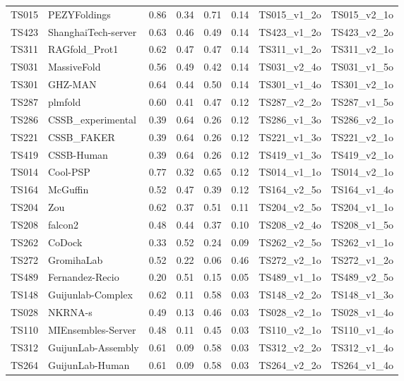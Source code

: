 \begin{longtable}{llllllll}
TS015 & PEZYFoldings & 0.86 & 0.34 & 0.71 & 0.14 & TS015\_v1\_2o & TS015\_v2\_1o \\ 
TS423 & ShanghaiTech-server & 0.63 & 0.46 & 0.49 & 0.14 & TS423\_v1\_2o & TS423\_v2\_2o \\ 
TS311 & RAGfold\_Prot1 & 0.62 & 0.47 & 0.47 & 0.14 & TS311\_v1\_2o & TS311\_v2\_1o \\ 
TS031 & MassiveFold & 0.56 & 0.49 & 0.42 & 0.14 & TS031\_v2\_4o & TS031\_v1\_5o \\ 
TS301 & GHZ-MAN & 0.64 & 0.44 & 0.50 & 0.14 & TS301\_v1\_4o & TS301\_v2\_1o \\ 
TS287 & plmfold & 0.60 & 0.41 & 0.47 & 0.12 & TS287\_v2\_2o & TS287\_v1\_5o \\ 
TS286 & CSSB\_experimental & 0.39 & 0.64 & 0.26 & 0.12 & TS286\_v1\_3o & TS286\_v2\_1o \\ 
TS221 & CSSB\_FAKER & 0.39 & 0.64 & 0.26 & 0.12 & TS221\_v1\_3o & TS221\_v2\_1o \\ 
TS419 & CSSB-Human & 0.39 & 0.64 & 0.26 & 0.12 & TS419\_v1\_3o & TS419\_v2\_1o \\ 
TS014 & Cool-PSP & 0.77 & 0.32 & 0.65 & 0.12 & TS014\_v1\_1o & TS014\_v2\_1o \\ 
TS164 & McGuffin & 0.52 & 0.47 & 0.39 & 0.12 & TS164\_v2\_5o & TS164\_v1\_4o \\ 
TS204 & Zou & 0.62 & 0.37 & 0.51 & 0.11 & TS204\_v2\_5o & TS204\_v1\_1o \\ 
TS208 & falcon2 & 0.48 & 0.44 & 0.37 & 0.10 & TS208\_v2\_4o & TS208\_v1\_5o \\ 
TS262 & CoDock & 0.33 & 0.52 & 0.24 & 0.09 & TS262\_v2\_5o & TS262\_v1\_1o \\ 
TS272 & GromihaLab & 0.52 & 0.22 & 0.06 & 0.46 & TS272\_v2\_1o & TS272\_v1\_2o \\ 
TS489 & Fernandez-Recio & 0.20 & 0.51 & 0.15 & 0.05 & TS489\_v1\_1o & TS489\_v2\_5o \\ 
TS148 & Guijunlab-Complex & 0.62 & 0.11 & 0.58 & 0.03 & TS148\_v2\_2o & TS148\_v1\_3o \\ 
TS028 & NKRNA-s & 0.49 & 0.13 & 0.46 & 0.03 & TS028\_v2\_1o & TS028\_v1\_4o \\ 
TS110 & MIEnsembles-Server & 0.48 & 0.11 & 0.45 & 0.03 & TS110\_v2\_1o & TS110\_v1\_4o \\ 
TS312 & GuijunLab-Assembly & 0.61 & 0.09 & 0.58 & 0.03 & TS312\_v2\_2o & TS312\_v1\_4o \\ 
TS264 & GuijunLab-Human & 0.61 & 0.09 & 0.58 & 0.03 & TS264\_v2\_2o & TS264\_v1\_4o \\ 

\end{longtable}

